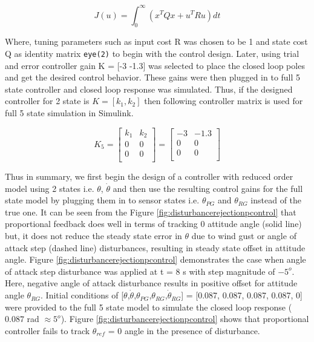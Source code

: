 \documentclass[12pt]{article}
\begin{document}
	\begin{equation}
	J(u) = \int_{0}^{\infty} (x^{T}Qx + u^{T}Ru) dt
	\end{equation}
	
	\noindent Where, tuning parameters such as input cost R was chosen to be 1 and state cost Q as identity matrix \texttt{eye(2)} to begin with the control design. Later, using trial and error controller gain K = [-3 -1.3] was selected to place the closed loop poles and get the desired control behavior. These gains were then plugged in to full 5 state controller and closed loop response was simulated. Thus, if the designed controller for 2 state is $K = [k_1,  k_2]$ then following controller matrix is used for full 5 state simulation in Simulink.
	
	\begin{equation}
	K_5 = \begin{bmatrix}
	k_1 & k_2\\
	0&0\\
	0&0\\
	\end{bmatrix} = \begin{bmatrix}
	-3 & -1.3 \\
	0&0\\
	0&0\\
	\end{bmatrix}
	\end{equation}
	
	\noindent Thus in summary, we first begin the design of a controller with reduced order model using 2 states i.e. $\theta$, $\dot{\theta}$ and then use the resulting control gains for the full state model by plugging them in to sensor states i.e. $\theta_{PG}$ and $\theta_{RG}$ instead of the true one. It can be seen from the Figure \ref{fig:disturbancerejectionpcontrol} that proportional feedback does well in terms of tracking 0 attitude angle (solid line) but, it does not reduce the steady state error in $\theta$ due to wind gust or angle of attack step (dashed line) disturbances, resulting in steady state offset in attitude angle. Figure \ref{fig:disturbancerejectionpcontrol} demonstrates the case when angle of attack step disturbance was applied at t = 8 s with step magnitude of $-5^{o}$. Here, negative angle of attack disturbance results in positive offset for attitude angle $\theta_{RG}$. Initial conditions of [$\theta$,$\dot{\theta}$,$\theta_{PG}$,$\theta_{RG}$,$\dot{\theta}_{RG}$] = [0.087, 0.087, 0.087, 0.087, 0] were provided to the full 5 state model to simulate the closed loop response ($0.087$ rad $\approx 5^{o}$). Figure \ref{fig:disturbancerejectionpcontrol} shows that proportional controller fails to track $\theta_{ref}$ = 0 angle in the presence of disturbance.
	
\end{document}
